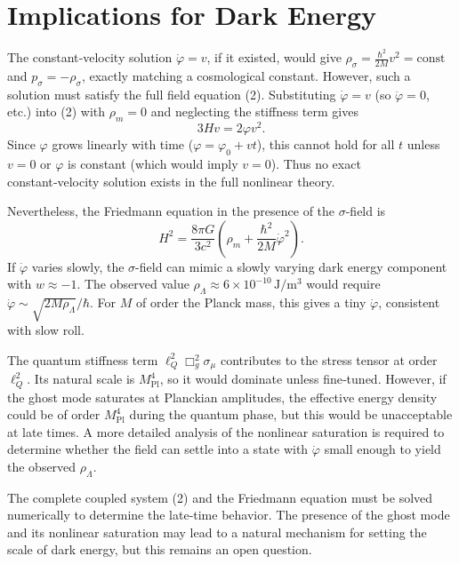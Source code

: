 \documentclass[11pt,a4paper]{article}
\begin{document}
\section{Implications for Dark Energy}
\label{sec:DE}

The constant‑velocity solution \(\dot\varphi = v\), if it existed, would give \(\rho_\sigma = \frac{\hbar^2}{2M} v^2 = \text{const}\) and \(p_\sigma = -\rho_\sigma\), exactly matching a cosmological constant. However, such a solution must satisfy the full field equation (2). Substituting \(\dot\varphi = v\) (so \(\ddot\varphi = 0\), etc.) into (2) with \(\rho_m=0\) and neglecting the stiffness term gives
\begin{equation}
3H v = 2\varphi v^2.
\end{equation}
Since \(\varphi\) grows linearly with time (\(\varphi = \varphi_0 + vt\)), this cannot hold for all \(t\) unless \(v=0\) or \(\varphi\) is constant (which would imply \(v=0\)). Thus no exact constant‑velocity solution exists in the full nonlinear theory.

Nevertheless, the Friedmann equation in the presence of the \(\sigma\)-field is
\begin{equation}
H^2 = \frac{8\pi G}{3c^2} \left( \rho_m + \frac{\hbar^2}{2M} \dot\varphi^2 \right).
\end{equation}
If \(\dot\varphi\) varies slowly, the \(\sigma\)-field can mimic a slowly varying dark energy component with \(w \approx -1\). The observed value \(\rho_\Lambda \approx 6\times10^{-10}\,\mathrm{J/m^3}\) would require \(\dot\varphi \sim \sqrt{2M\rho_\Lambda}/\hbar\). For \(M\) of order the Planck mass, this gives a tiny \(\dot\varphi\), consistent with slow roll.

The quantum stiffness term \(\ell_Q^2\Box_g^2\sigma_\mu\) contributes to the stress tensor at order \(\ell_Q^2\). Its natural scale is \(M_{\mathrm{Pl}}^4\), so it would dominate unless fine‑tuned. However, if the ghost mode saturates at Planckian amplitudes, the effective energy density could be of order \(M_{\mathrm{Pl}}^4\) during the quantum phase, but this would be unacceptable at late times. A more detailed analysis of the nonlinear saturation is required to determine whether the field can settle into a state with \(\dot\varphi\) small enough to yield the observed \(\rho_\Lambda\).

The complete coupled system (2) and the Friedmann equation must be solved numerically to determine the late‑time behavior. The presence of the ghost mode and its nonlinear saturation may lead to a natural mechanism for setting the scale of dark energy, but this remains an open question.
\end{document}
